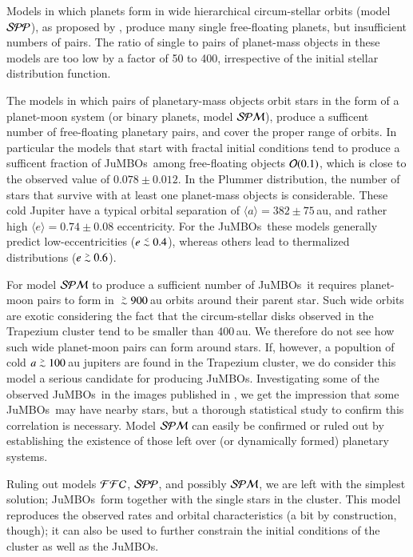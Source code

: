 \documentclass[submission,phys]{lib/SciPost}
\def\apgt{\ {\raise-.5ex\hbox{$\buildrel>\over\sim$}}\ }
\def\aplt{\ {\raise-.5ex\hbox{$\buildrel<\over\sim$}}\ }
\newcommand{\jumbos}{\mbox{JuMBOs}}
\begin{document}
Models in which planets form in wide hierarchical circum-stellar
orbits (model ${\cal SPP}$), as proposed by
\cite{2023arXiv231006016W}, produce many single free-floating planets,
but insufficient numbers of pairs. The ratio of single to pairs of
planet-mass objects in these models are too low by a factor of 50 to
400, irrespective of the initial stellar distribution function.

The models in which pairs of planetary-mass objects orbit stars in the
form of a planet-moon system (or binary planets, model ${\cal SPM}$),
produce a sufficent number of free-floating planetary pairs, and cover
the proper range of orbits.  In particular the models that start with
fractal initial conditions tend to produce a sufficent fraction of
\jumbos\, among free-floating objects ${\cal O}(0.1)$, which is close
to the observed value of $0.078\pm0.012$. In the Plummer distribution,
the number of stars that survive with at least one planet-mass objects
is considerable.  These cold Jupiter have a typical orbital separation
of $\langle a\rangle = 382\pm75$\,au, and rather high $\langle e \rangle
= 0.74\pm 0.08$ eccentricity.  For the \jumbos\, these models
generally predict low-eccentricities ($e\aplt 0.4$), whereas others
lead to thermalized distributions ($e\apgt 0.6$).

For model ${\cal SPM}$ to produce a sufficient number of \jumbos\, it
requires planet-moon pairs to form in $\apgt 900$\,au orbits around
their parent star. Such wide orbits are exotic considering the fact
that the circum-stellar disks observed in the Trapezium cluster tend
to be smaller than 400\,au. We therefore do not see how such wide
planet-moon pairs can form around stars. If, however, a popultion of
cold $a\apgt 100$\,au jupiters are found in the Trapezium cluster, we
do consider this model a serious candidate for producing \jumbos.
Investigating some of the observed \jumbos\ in the images published in
\cite{2023arXiv231001231P}, we get the impression that some \jumbos\,
may have nearby stars, but a thorough statistical study to confirm
this correlation is necessary.  Model ${\cal SPM}$ can easily be
confirmed or ruled out by establishing the existence of those left
over (or dynamically formed) planetary systems.

Ruling out models ${\cal FFC}$, ${\cal SPP}$, and possibly ${\cal
  SPM}$, we are left with the simplest solution; \jumbos\, form
together with the single stars in the cluster.  This model reproduces
the observed rates and orbital characteristics (a bit by construction,
though); it can also be used to further constrain the initial
conditions of the cluster as well as the \jumbos.
\end{document}

